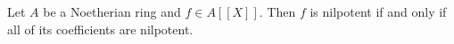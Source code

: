Let $A$ be a Noetherian ring and $f \in A[[X]]$. Then $f$ is
nilpotent if and only if all of its coefficients are nilpotent.

